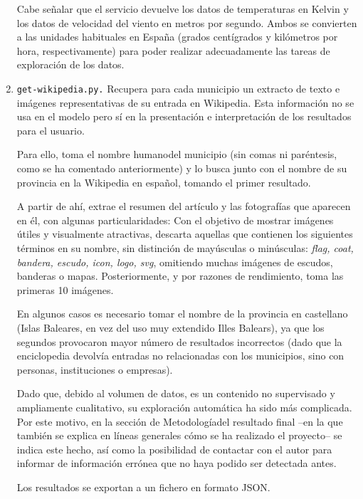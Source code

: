 \begin{enumerate}
    Cabe señalar que el servicio devuelve los datos de temperaturas en Kelvin y los datos de velocidad del viento en metros por segundo. Ambos se convierten a las unidades habituales en España (grados centígrados y kilómetros por hora, respectivamente) para poder realizar adecuadamente las tareas de exploración de los datos.
    
    \item \texttt{get-wikipedia.py.} Recupera para cada municipio un extracto de texto e imágenes representativas de su entrada en Wikipedia. Esta información no se usa en el modelo pero sí en la presentación e interpretación de los resultados para el usuario.

    Para ello, toma el nombre \guillemotleft humano\guillemotright\space del municipio (sin comas ni paréntesis, como se ha comentado anteriormente) y lo busca junto con el nombre de su provincia en la Wikipedia en español, tomando el primer resultado.
    
    A partir de ahí, extrae el resumen del artículo y las fotografías que aparecen en él, con algunas particularidades: Con el objetivo de mostrar imágenes útiles y visualmente atractivas, descarta aquellas que contienen los siguientes términos en su nombre, sin distinción de mayúsculas o minúsculas: \textit{flag, coat, bandera, escudo, icon, logo, svg}, omitiendo muchas imágenes de escudos, banderas o mapas. Posteriormente, y por razones de rendimiento, toma las primeras 10 imágenes.
    
    En algunos casos es necesario tomar el nombre de la provincia en castellano (\guillemotleft Islas Baleares\guillemotright, en vez del uso muy extendido \guillemotleft Illes Balears\guillemotright\space), ya que los segundos provocaron mayor número de resultados incorrectos (dado que la enciclopedia devolvía entradas no relacionadas con los municipios, sino con personas, instituciones o empresas).
    
    Dado que, debido al volumen de datos, es un contenido no supervisado y ampliamente cualitativo, su exploración automática ha sido más complicada. Por este motivo, en la sección de \guillemotleft Metodología\guillemotright\space del resultado final –en la que también se explica en líneas generales cómo se ha realizado el proyecto– se indica este hecho, así como la posibilidad de contactar con el autor para informar de información errónea que no haya podido ser detectada antes.
    
    Los resultados se exportan a un fichero en formato JSON.


\end{enumerate}
